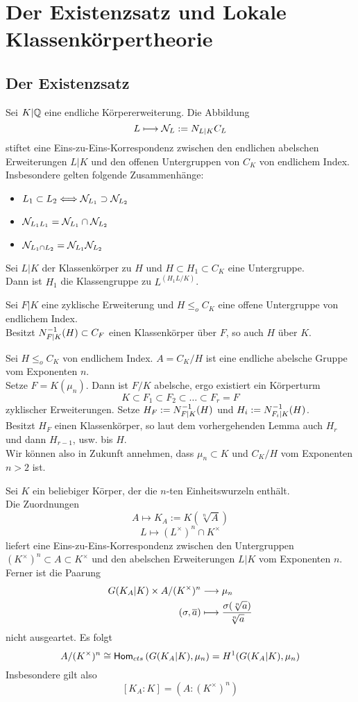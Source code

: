 \chapter{Der Existenzsatz und Lokale Klassenkörpertheorie}
\section{Der Existenzsatz}
Sei $K|\mathbb{Q}$ eine endliche Körpererweiterung. Die Abbildung
\[ L \longmapsto \mathcal{N}_L := N_{L|K}C_L \]
stiftet eine Eins-zu-Eins-Korrespondenz zwischen den endlichen abelschen Erweiterungen $L|K$ und den offenen Untergruppen von $C_K$ von endlichem Index.\\
Insbesondere gelten folgende Zusammenhänge:
\begin{itemize}
\item $L_1 \subset L_2 \overset{}{\Longleftrightarrow} \mathcal{N}_{L_1} \supset \mathcal{N}_{L_2}$
\item $\mathcal{N}_{L_1L_1} = \mathcal{N}_{L_1}\cap \mathcal{N}_{L_2}$
\item $\mathcal{N}_{L_1\cap L_2} = \mathcal{N}_{L_1} \mathcal{N}_{L_2}$
\end{itemize}

\Lem{}
Sei $L|K$ der Klassenkörper zu $H$ und $H \subset H_1 \subset C_K$ eine Untergruppe.\\
Dann ist $H_1$ die Klassengruppe zu $L^{(H_1 L/K)}$.

\Lem{}
Sei $F|K$ eine zyklische Erweiterung und $H\leq_o C_K$ eine offene Untergruppe von endlichem Index.\\
Besitzt $N_{F|K}^{-1}(H) \subset C_F$ einen Klassenkörper über $F$, so auch $H$ über $K$.

\Bem{}
Sei $H\leq_o C_K$ von endlichem Index. $A = C_K/H$ ist eine endliche abelsche Gruppe vom Exponenten $n$.\\
Setze $F = K(\mu_n)$. Dann ist $F/K$ abelsche, ergo existiert ein Körperturm
\[ K \subset F_1 \subset F_2 \subset \ldots \subset F_r = F \]
zyklischer Erweiterungen. Setze $H_F := N_{F|K}^{-1} (H)$ und $H_i := N_{F_i|K}^{-1}(H)$.\\
Besitzt $H_F$ einen Klassenkörper, so laut dem vorhergehenden Lemma auch $H_r$ und dann $H_{r-1}$, usw. bis $H$.\\
Wir können also in Zukunft annehmen, dass $\mu_n \subset K$ und $C_K/H$ vom Exponenten $n > 2$ ist.

Sei $K$ ein beliebiger Körper, der die $n$-ten Einheitswurzeln enthält.\\
Die Zuordnungen
\[ A \longmapsto K_A := K(\sqrt[n]{A}) \]
\[ L \longmapsto (L^\times)^n \cap K^\times   \]
liefert eine Eins-zu-Eins-Korrespondenz zwischen den Untergruppen $ (K^\times)^n\subset A \subset K^\times$ und den abelschen Erweiterungen $L|K$ vom Exponenten $n$.\\
Ferner ist die Paarung
\begin{align*}
G(K_A|K) \times A/(K^\times)^n & \overset{}{\longrightarrow} \mu_n\\
(\sigma, \overline{a}) &\longmapsto \frac{\sigma(\sqrt[n]{a})}{\sqrt[n]{a}}
\end{align*}
nicht ausgeartet. Es folgt
\[ A/(K^\times)^n \overset{}{\cong} \textsf{Hom}_{cts}\left(G(K_A|K), \mu_n\right) = H^1(G(K_A|K),\mu_n) \]
Insbesondere gilt also
\[ [K_A : K] = (A : (K^\times)^n) \]

